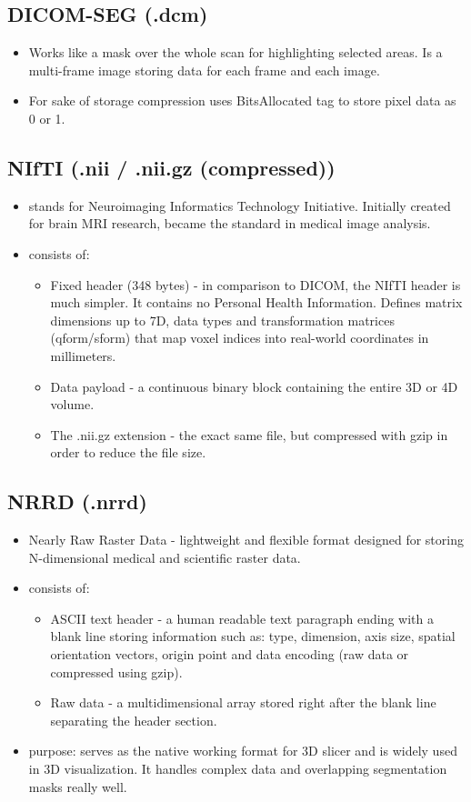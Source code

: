 \documentclass[11pt, a4paper]{article}
\begin{document}
\subsection{DICOM-SEG (.dcm)}
\begin{itemize}
    \item Works like a mask over the whole scan for highlighting selected areas. Is a multi-frame image storing data for each frame and each image.
    \item For sake of storage compression uses BitsAllocated tag to store pixel data as 0 or 1.
\end{itemize}

\subsection{NIfTI (.nii / .nii.gz (compressed))}
\begin{itemize}
    \item stands for Neuroimaging Informatics Technology Initiative. Initially created for brain MRI research, became the standard in medical image analysis.
    \item consists of:
    \begin{itemize}
        \item Fixed header (348 bytes) -  in comparison to DICOM, the NIfTI header is much simpler. It contains no Personal Health Information. Defines matrix dimensions up to 7D, data types and transformation matrices (qform/sform) that map voxel indices into real-world coordinates in millimeters.
        \item Data payload - a continuous binary block containing the entire 3D or 4D volume.
        \item The .nii.gz extension - the exact same file, but compressed with gzip in order to reduce the file size.
    \end{itemize}
\end{itemize}

\subsection{NRRD (.nrrd)}
\begin{itemize}
    \item Nearly Raw Raster Data - lightweight and flexible format designed for storing N-dimensional medical and scientific raster data.
    \item consists of:
    \begin{itemize}
        \item ASCII text header - a human readable text paragraph ending with a blank line storing information such as: type, dimension, axis size, spatial orientation vectors, origin point and data encoding (raw data or compressed using gzip).
        \item Raw data - a multidimensional array stored right after the blank line separating the header section.
    \end{itemize}
    \item purpose: serves as the native working format for 3D slicer and is widely used in 3D visualization. It handles complex data and overlapping segmentation masks really well.
\end{itemize}
\end{document}
